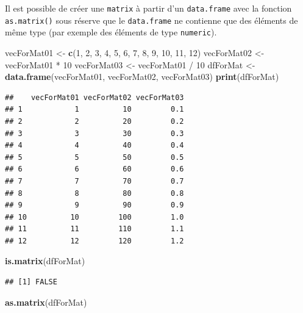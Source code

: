 \documentclass[twoside,symmetric]{book}
\newenvironment{Shaded}{}{}
\newcommand{\DecValTok}[1]{#1}
\newcommand{\KeywordTok}[1]{\textbf{#1}}
\newcommand{\NormalTok}[1]{#1}
\newcommand{\OperatorTok}[1]{#1}
\newcommand{\StringTok}[1]{#1}
\begin{document}
Il est possible de créer une \texttt{matrix} à partir d'un \texttt{data.frame} avec la fonction \texttt{as.matrix()} sous réserve que le \texttt{data.frame} ne contienne que des éléments de même type (par exemple des éléments de type \texttt{numeric}).

\begin{Shaded}
\begin{Highlighting}[]
\NormalTok{vecForMat01 <-}\StringTok{ }\KeywordTok{c}\NormalTok{(}\DecValTok{1}\NormalTok{, }\DecValTok{2}\NormalTok{, }\DecValTok{3}\NormalTok{, }\DecValTok{4}\NormalTok{, }\DecValTok{5}\NormalTok{, }\DecValTok{6}\NormalTok{, }\DecValTok{7}\NormalTok{, }\DecValTok{8}\NormalTok{, }\DecValTok{9}\NormalTok{, }\DecValTok{10}\NormalTok{, }\DecValTok{11}\NormalTok{, }\DecValTok{12}\NormalTok{)}
\NormalTok{vecForMat02 <-}\StringTok{ }\NormalTok{vecForMat01 }\OperatorTok{*}\StringTok{ }\DecValTok{10}
\NormalTok{vecForMat03 <-}\StringTok{ }\NormalTok{vecForMat01 }\OperatorTok{/}\StringTok{ }\DecValTok{10}
\NormalTok{dfForMat <-}\StringTok{ }\KeywordTok{data.frame}\NormalTok{(vecForMat01, vecForMat02, vecForMat03)}
\KeywordTok{print}\NormalTok{(dfForMat)}
\end{Highlighting}
\end{Shaded}

\begin{verbatim}
##    vecForMat01 vecForMat02 vecForMat03
## 1            1          10         0.1
## 2            2          20         0.2
## 3            3          30         0.3
## 4            4          40         0.4
## 5            5          50         0.5
## 6            6          60         0.6
## 7            7          70         0.7
## 8            8          80         0.8
## 9            9          90         0.9
## 10          10         100         1.0
## 11          11         110         1.1
## 12          12         120         1.2
\end{verbatim}

\begin{Shaded}
\begin{Highlighting}[]
\KeywordTok{is.matrix}\NormalTok{(dfForMat)}
\end{Highlighting}
\end{Shaded}

\begin{verbatim}
## [1] FALSE
\end{verbatim}

\begin{Shaded}
\begin{Highlighting}[]
\KeywordTok{as.matrix}\NormalTok{(dfForMat)}
\end{Highlighting}
\end{Shaded}
\end{document}
